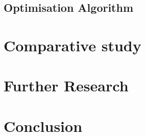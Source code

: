 \documentclass[conference,a4paper]{IEEEtran}
\begin{document}
\subsection{Optimisation Algorithm}

\section{Comparative study}
\label{sec:ComparativeStudy}
\section{Further Research}
\label{sec:FurtherResearch}
\section{Conclusion}
\label{sec:Conclusion}





%
%
%



\newpage


%




\end{document}
